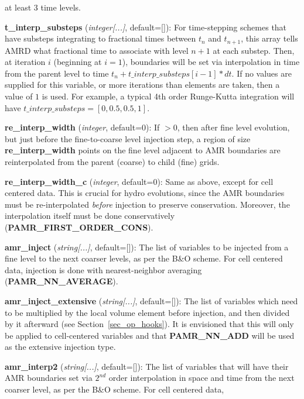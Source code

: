 \documentclass[aps,amssymb,unsortedaddress,nofootinbib]{revtex4}
\def\lsep{\itemsep 0.05in}
\begin{document}
\begin{list}{}{\lsep}
      at least 3 time levels.
\item {\bf t\_interp\_substeps} ({\em integer[...]}, default=[]):
      For time-stepping schemes that have substeps integrating to fractional times
      between $t_n$ and $t_{n+1}$, this array tells AMRD what fractional
      time to associate with level $n+1$ at each substep. Then,
      at iteration $i$ (beginning at $i=1$), boundaries will be set via
      interpolation in time from the parent level to time $t_n + t\_interp\_substeps[i-1]*dt$.
      If no values are supplied for this variable, or more iterations than elements are taken,
      then a value of $1$ is used. For example, a typical 4th order Runge-Kutta integration
      will have $t\_interp\_substeps=[0,0.5,0.5,1]$.
\item {\bf re\_interp\_width} ({\em integer}, default=0):
      If $>0$, then after fine level evolution, but just before the
      fine-to-coarse level injection step, a region of size {\bf re\_interp\_width}
      points on the fine level adjacent to AMR boundaries are reinterpolated from the parent (coarse)
      to child (fine) grids.  
\item {\bf re\_interp\_width\_c} ({\em integer}, default=0):
      Same as above, except for cell centered data.  This is crucial for hydro evolutions, since
      the AMR boundaries must be re-interpolated {\it before} injection to preserve conservation.
      Moreover, the interpolation itself must be done conservatively ({\bf PAMR\_FIRST\_ORDER\_CONS}).
\item {\bf amr\_inject} ({\em string[...]}, default=[]):
      The list of variables to be injected from a fine level to the next
      coarser levels, as per the B\&O scheme.  For cell centered data, injection
      is done with nearest-neighbor averaging ({\bf PAMR\_NN\_AVERAGE}).
\item {\bf amr\_inject\_extensive} ({\em string[...]}, default=[]):
      The list of variables which need to be multiplied by the local volume element
      before injection, and then divided by it afterward (see Section~\ref{sec_op_hooks}).
      It is envisioned that this will only be applied to cell-centered variables and that
      {\bf PAMR\_NN\_ADD} will be used as the extensive injection type.
\item {\bf amr\_interp2} ({\em string[...]}, default=[]):
      The list of variables that will have their AMR boundaries set
      via $2^{nd}$ order interpolation in space and time from
      the next coarser level, as per the B\&O scheme.  For cell centered data,

\end{list}
\end{document}
